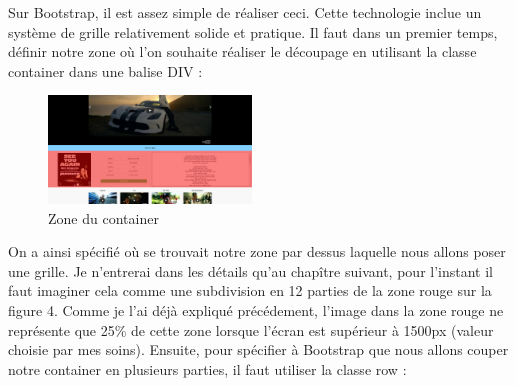 \documentclass{article}
\begin{document}
Sur Bootstrap, il est assez simple de r\'ealiser ceci. Cette technologie inclue un syst\`eme de grille relativement solide et pratique. Il faut dans un premier temps, d\'efinir notre zone o\`u l'on souhaite r\'ealiser le d\'ecoupage en utilisant la classe \og container \fg{} dans une balise DIV :
\vspace{0.5cm}\\
\vspace{0.5cm}
\begin{figure}
  \vspace{-20pt}
  \begin{center}
    \includegraphics[width=0.48\textwidth]{p9}
  \end{center}
  \vspace{-20pt}
  \caption{Zone du container}
  \vspace{-10pt}
\end{figure} 
\hspace*{0.6cm}On a ainsi sp\'ecifi\'e o\`u se trouvait notre zone par dessus laquelle nous allons poser une grille. Je n'entrerai dans les d\'etails qu'au chap\^itre suivant, pour l'instant il faut imaginer cela comme une subdivision en 12 parties de la zone rouge sur la figure 4. Comme je l'ai d\'ej\`a expliqu\'e pr\'ec\'edement, l'image dans la zone rouge ne repr\'esente que 25\% de cette zone lorsque l'\'ecran est sup\'erieur \`a 1500px (valeur choisie par mes soins). Ensuite, pour sp\'ecifier \`a Bootstrap que nous allons couper notre container en plusieurs parties, il faut utiliser la classe \og row \fg{} : 
\vspace{0.5cm}\\
\vspace{0.5cm}\\
\end{document}
